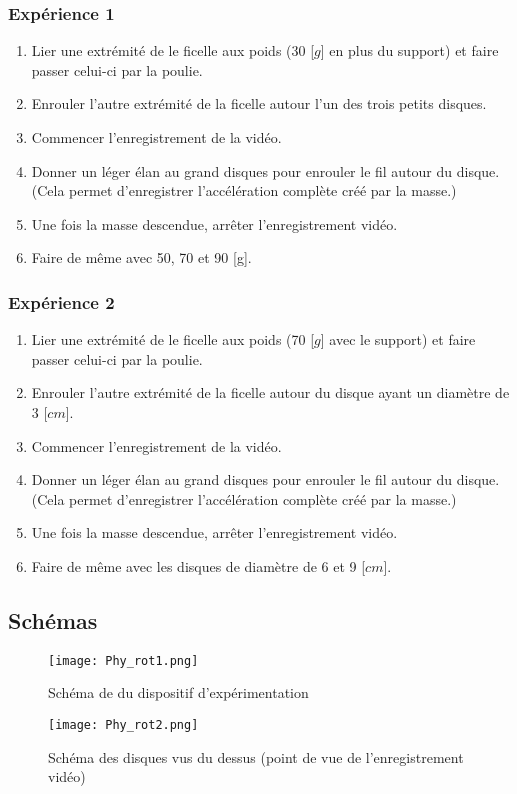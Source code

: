 \subsubsection{Expérience 1}
\begin{enumerate}
    \item Lier une extrémité de le ficelle aux poids (30 [$g$] en plus du support) et faire passer celui-ci par la poulie.
    \item Enrouler l'autre extrémité de la ficelle autour l'un des trois petits disques.
    \item Commencer l'enregistrement de la vidéo.
    \item Donner un léger élan au grand disques pour enrouler le fil autour du disque. (Cela permet d'enregistrer l'accélération complète créé par la masse.)
    \item Une fois la masse descendue, arrêter l'enregistrement vidéo.
    \item Faire de même avec 50, 70 et 90 [g].
\end{enumerate}

\subsubsection{Expérience 2}
\begin{enumerate}
    \item Lier une extrémité de le ficelle aux poids (70 [$g$] avec le support) et faire passer celui-ci par la poulie.
    \item Enrouler l'autre extrémité de la ficelle autour du disque ayant un diamètre de 3 [$cm$].
    \item Commencer l'enregistrement de la vidéo.
    \item Donner un léger élan au grand disques pour enrouler le fil autour du disque. (Cela permet d'enregistrer l'accélération complète créé par la masse.)
    \item Une fois la masse descendue, arrêter l'enregistrement vidéo.
    \item Faire de même avec les disques de diamètre de 6 et 9 [$cm$].
\end{enumerate}

\subsection{Schémas}
\begin{minipage}{.5\textwidth}
\begin{figure}[H]
  \centering
    \texttt{[image: Phy\_rot1.png]}
    \caption{Schéma de du dispositif d'expérimentation}
    \label{fig:schm-glob}
\end{figure}
\end{minipage}
\begin{minipage}{.5\textwidth}
\begin{figure}[H]
  \centering
    \texttt{[image: Phy\_rot2.png]}
    \caption{Schéma des disques vus du dessus (point de vue de l'enregistrement vidéo)}
    \label{fig:schm-up}
\end{figure}
\end{minipage}
